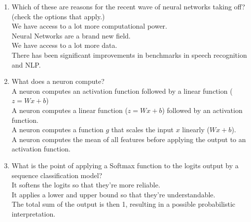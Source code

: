 \begin{enumerate}
    \item Which of these are reasons for the recent wave of neural networks taking off? (check the options that apply.) \\ 
        \hspace{1cm}\checkedchoice{} We have access to a lot more computational power.\\
        \hspace{1cm}\choice{} Neural Networks are a brand new field.\\
        \hspace{1cm}\checkedchoice{} We have access to a lot more data.\\
        \hspace{1cm}\checkedchoice{} There has been significant improvements in benchmarks in speech recognition and NLP.\\
        \solution{}
    \item What does a neuron compute? \\ 
        \hspace{1cm}\choice{} A neuron computes an activation function followed by a linear function ($z = Wx + b$)\\
        \hspace{1cm}\checkedchoice{} A neuron computes a linear function ($z = Wx + b$) followed by an activation function.\\
        \hspace{1cm}\choice{} A neuron computes a function $g$ that scales the input $x$ linearly ($Wx + b$).\\
        \hspace{1cm}\choice{} A neuron computes the mean of all features before applying the output to an activation function.\\
        \solution{}

    \item  What is the point of applying a Softmax function to the logits output by a sequence classification model? \\ 
        \hspace{1cm}\checkedchoice{} It softens the logits so that they're more reliable. \\ 
        \hspace{1cm}\checkedchoice{} It applies a lower and upper bound so that they're understandable. \\ 
        \hspace{1cm}\checkedchoice{} The total sum of the output is then 1, resulting in a possible probabilistic interpretation.\\
        \solution{}
    
\end{enumerate}

